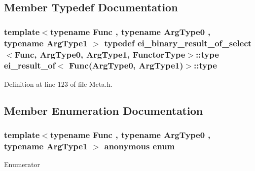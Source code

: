 \subsection{Member Typedef Documentation}
\hypertarget{structei__result__of_3_01_func_07_arg_type0_00_01_arg_type1_08_4_a6232bd65458d646fec6f99ae535593c4}{
\subsubsection[{type}]{\setlength{\rightskip}{0pt plus 5cm}template$<$typename Func , typename Arg\-Type0 , typename Arg\-Type1 $>$ typedef {\bf ei\-\_\-binary\-\_\-result\-\_\-of\-\_\-select}$<$Func, Arg\-Type0, Arg\-Type1, {\bf Functor\-Type}$>$\-::{\bf type} {\bf ei\-\_\-result\-\_\-of}$<$ Func(Arg\-Type0, Arg\-Type1)$>$\-::{\bf type}}}\label{structei__result__of_3_01_func_07_arg_type0_00_01_arg_type1_08_4_a6232bd65458d646fec6f99ae535593c4}


Definition at line 123 of file Meta.\-h.



\subsection{Member Enumeration Documentation}
\hypertarget{structei__result__of_3_01_func_07_arg_type0_00_01_arg_type1_08_4_a97e925166457ea3f718723914f014052}{\subsubsection[{anonymous enum}]{\setlength{\rightskip}{0pt plus 5cm}template$<$typename Func , typename Arg\-Type0 , typename Arg\-Type1 $>$ anonymous enum}}\label{structei__result__of_3_01_func_07_arg_type0_00_01_arg_type1_08_4_a97e925166457ea3f718723914f014052}
\begin{Desc}
\item[Enumerator]\par
\begin{description}
\item[{\em 
\hypertarget{structei__result__of_3_01_func_07_arg_type0_00_01_arg_type1_08_4_a97e925166457ea3f718723914f014052a26b141000332d6c74e48e0462465b26f}{Functor\-Type}\label{structei__result__of_3_01_func_07_arg_type0_00_01_arg_type1_08_4_a97e925166457ea3f718723914f014052a26b141000332d6c74e48e0462465b26f}
}]\end{description}
\end{Desc}


